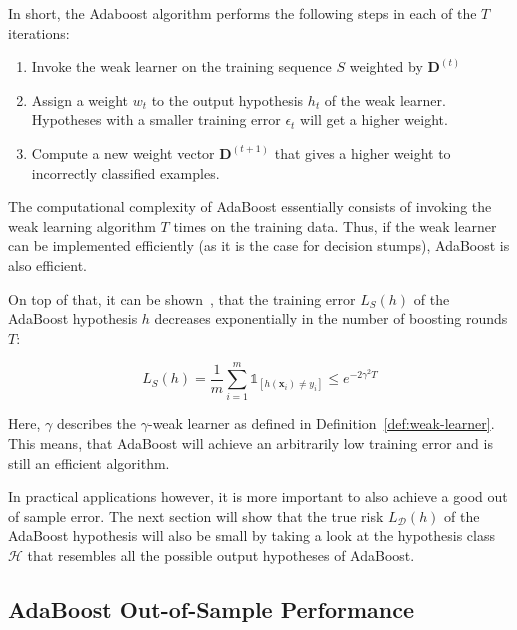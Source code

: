 In short, the Adaboost algorithm performs the following steps in each of the $T$ iterations:
\begin{enumerate}
    \item Invoke the weak learner on the training sequence $S$ weighted by $\mathbf{D}^{(t)}$
    \item Assign a weight $w_t$ to the output hypothesis $h_t$ of the weak learner. Hypotheses with a smaller
        training error $\epsilon_t$ will get a higher weight.
    \item Compute a new weight vector $\mathbf{D}^{(t+1)}$ that gives a higher weight to incorrectly classified
        examples.
\end{enumerate}

The computational complexity of AdaBoost essentially consists of invoking the weak learning algorithm $T$ times on
the training data. Thus, if the weak learner can be implemented efficiently (as it is the case for decision stumps),
AdaBoost is also efficient.

On top of that, it can be shown~\cite{SSBD14}, 
that the training error $L_S(h)$ of the AdaBoost hypothesis $h$ decreases exponentially
in the number of boosting rounds $T$:
\begin{linenomath*}
    $$
    L_S(h) = \frac{1}{m} \sum_{i=1}^m \mathds{1}_{\left[ h(\mathbf{x}_i) \neq y_i \right]} \leq e^{-2 \gamma^2 T}
    $$
\end{linenomath*}
Here, $\gamma$ describes the $\gamma$-weak learner as defined in Definition~\ref{def:weak-learner}.
This means, that AdaBoost will achieve an arbitrarily low training error and is still an efficient algorithm.

In practical applications however, it is more important to also achieve a good out of sample error. The next section will
show that the true risk $L_\mathcal{D}(h)$ of the AdaBoost hypothesis will also be small by taking a look at the
hypothesis class $\mathcal{H}$ that resembles all the possible output hypotheses of AdaBoost.

\subsection{AdaBoost Out-of-Sample Performance}
